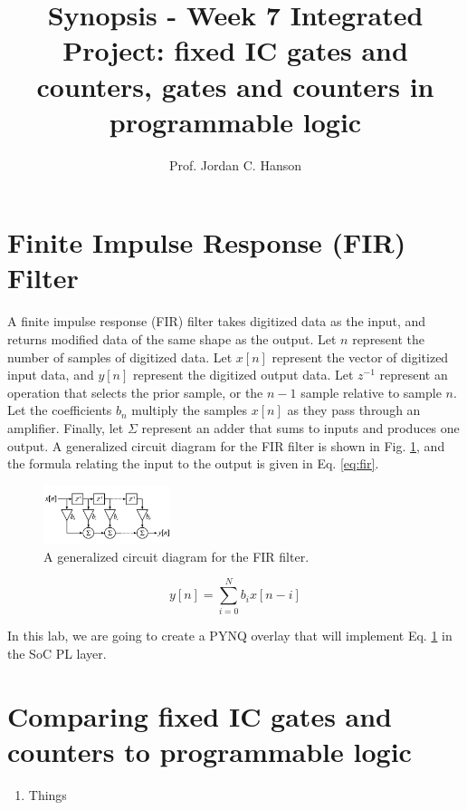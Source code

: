 \documentclass{article}
\begin{document}
\title{Synopsis - Week 7 Integrated Project: fixed IC gates and counters, gates and counters in programmable logic}
\author{Prof. Jordan C. Hanson}

\maketitle

\section{Finite Impulse Response (FIR) Filter}

\noindent
A finite impulse response (FIR) filter takes digitized data as the input, and returns modified data of the same shape as the output.  Let $n$ represent the number of samples of digitized data.  Let $x[n]$ represent the vector of digitized input data, and $y[n]$ represent the digitized output data.  Let $z^{-1}$ represent an operation that selects the prior sample, or the $n-1$ sample relative to sample $n$.  Let the coefficients $b_n$ multiply the samples $x[n]$ as they pass through an amplifier.  Finally, let $\Sigma$ represent an adder that sums to inputs and produces one output.  A generalized circuit diagram for the FIR filter is shown in Fig. \ref{fig:fir}, and the formula relating the input to the output is given in Eq. \ref{eq:fir}.

\begin{figure}[ht]
\centering
\includegraphics[width=0.33\textwidth]{figures/FIR_Filter.png}
\caption{\label{fig:fir} A generalized circuit diagram for the FIR filter.}
\end{figure}

\begin{equation}
y[n] = \sum_{i=0}^N b_i x[n-i]
\end{equation}

In this lab, we are going to create a PYNQ overlay that will implement Eq. \ref{fig:fir} in the SoC PL layer.

\section{Comparing fixed IC gates and counters to programmable logic}

\begin{enumerate}
\item Things
\end{enumerate}
\end{document}
